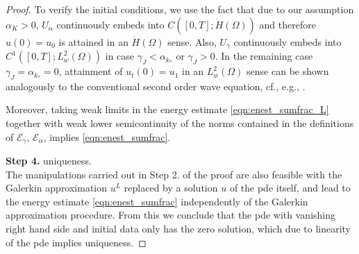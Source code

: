 \begin{proof}
To verify the initial conditions, we use the fact that due to our assumption $\alpha_K>0$, $U_\alpha$ continuously embeds into $C([0,T];\dot{H}(\Omega))$ and therefore $u(0)=u_0$ is attained in an $\dot{H}(\Omega)$ sense. 
Also, $U_\gamma$ continuously embeds into $C^1([0,T];L^2_w(\Omega))$ in case 
$\gamma_J<\alpha_{k_*}$ or $\gamma_J>0$. 
In the remaining case $\gamma_J=\alpha_{k_*}=0$, attainment of $u_t(0)=u_1$ in an $L^2_w(\Omega)$ sense can be shown analogously to the conventional second order wave equation, cf., e.g., \cite[Theorem 3 in Section 7.2]{Evans:2010}. 
\begin{comment}
In case of  $K=k_*$ and $\alpha_K=0$ we still have $U_\gamma\cap U_\alpha\subseteq C^1([0,T];L^2_w(\Omega))\cap C_w([0,T];\dot{H}(\Omega))$ with the subscript $w$ denoting weak continuity, by \cite[Lemma 3.3]{temam:2012}.
In the case $\gamma_J=\alpha_*=0$, we can divide by $d_J$ and make use of the proof of Corollary~\ref{cor:reg_sumfrac} to obtain uniform $H^2(0,T;\dot{H}(\Omega)^*)$ boundedness of the Galerkin approximations as well as the solution, so that \cite[Lemma 3.3]{temam:2012} applies and yields uniform boundedness in $C_w^1([0,T];L^2_w(\Omega))\cap C_{w}([0,T];\dot{H}(\Omega))$.
We can therefore take limits $k\to\infty$ along the weakly convergent subsequence $u^{L_k}$ to verify attainment of the initial conditions $(u(0),u_t(0))=(u_0,u_1)$ in an $\dot{H}(\Omega)\times L^2_w(\Omega)$ sense.
\end{comment}

Moreover, taking weak limits in the energy estimate \eqref{eqn:enest_sumfrac_L}
together with weak lower semicontinuity of the norms contained in the definitions
of $\mathcal{E}_\gamma$, $\mathcal{E}_\alpha$, implies \eqref{eqn:enest_sumfrac}.

\noindent
{\bf Step 4.} uniqueness.\\
The manipulations carried out in Step 2. of the proof are also feasible with the Galerkin approximation $u^L$ replaced by a solution $u$ of the {\sc pde} itself, and lead to the energy estimate \eqref{eqn:enest_sumfrac} independently of the Galerkin approximation procedure. 
From this we conclude that the  {\sc pde} with vanishing right hand side and initial data only has the zero solution, which due to linearity of the {\sc pde} implies uniqueness.
\end{proof}

